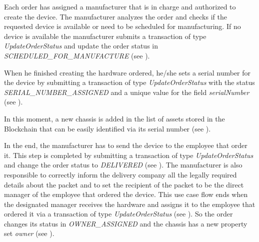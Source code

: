 Each order has assigned a manufacturer that is in charge and authorized to create the device.
The manufacturer analyzes the order and checks if the requested device is available or need to be scheduled for manufacturing. If no device is available the manufacturer submits a transaction of type \emph{UpdateOrderStatus} and update the order status in \emph{SCHEDULED_FOR_MANUFACTURE} (see ). 


When he finished creating the hardware ordered, he/she sets a serial number for the device by submitting a transaction of type \emph{UpdateOrderStatus} with the status \emph{SERIAL_NUMBER_ASSIGNED} and a unique value for the field \emph{serialNumber} (see ).


In this moment, a new chassis is added in the list of assets stored in the Blockchain that can be easily identified via its serial number (see ).


In the end, the manufacturer has to send the device to the employee that order it. This step is completed by submitting a transaction of type \emph{UpdateOrderStatus} and change the order status to \emph{DELIVERED} (see ). The manufacturer is also responsible to correctly inform the delivery company all the legally required details about the packet and to set the recipient of the packet to be the direct manager of the employee that ordered the device. 
This use case flow ends when the designated manager receives the hardware and assigns it to the employee that ordered it via a transaction of type \emph{UpdateOrderStatus} (see ). So the order changes its status in \emph{OWNER_ASSIGNED} and the chassis has a new property set \emph{owner} (see ).
 

